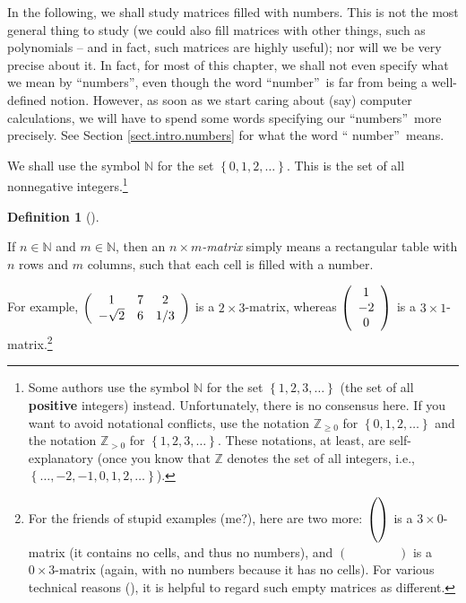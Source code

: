 \documentclass[numbers=enddot,12pt,final,onecolumn,notitlepage]{scrartcl}%
\theoremstyle{definition}
\newtheorem{defi}[theo]{Definition}
\newenvironment{definition}[1][]
{\begin{defi}[#1]\begin{leftbar}}
{\end{leftbar}\end{defi}}
\begin{document}
In the following, we shall study matrices filled with numbers. This is not the
most general thing to study (we could also fill matrices with other things,
such as polynomials -- and in fact, such matrices are highly useful); nor will
we be very precise about it. In fact, for most of this chapter, we shall not
even specify what we mean by \textquotedblleft numbers\textquotedblright, even
though the word \textquotedblleft number\textquotedblright\ is far from being
a well-defined notion. However, as soon as we start caring about (say)
computer calculations, we will have to spend some words specifying our
\textquotedblleft numbers\textquotedblright\ more precisely. See Section
\ref{sect.intro.numbers} for what the word \textquotedblleft
number\textquotedblright\ means.

We shall use the symbol $\mathbb{N}$ for the set $\left\{  0,1,2,\ldots
\right\}  $. This is the set of all nonnegative integers.\footnote{Some
authors use the symbol $\mathbb{N}$ for the set $\left\{  1,2,3,\ldots
\right\}  $ (the set of all \textbf{positive} integers) instead.
Unfortunately, there is no consensus here. If you want to avoid notational
conflicts, use the notation $\mathbb{Z}_{\geq0}$ for $\left\{  0,1,2,\ldots
\right\}  $ and the notation $\mathbb{Z}_{>0}$ for $\left\{  1,2,3,\ldots
\right\}  $. These notations, at least, are self-explanatory (once you know
that $\mathbb{Z}$ denotes the set of all integers, i.e., $\left\{
\ldots,-2,-1,0,1,2,\ldots\right\}  $).}

\begin{definition}
If $n\in\mathbb{N}$ and $m\in\mathbb{N}$, then an $n\times m$\textit{-matrix}
simply means a rectangular table with $n$ rows and $m$ columns, such that each
cell is filled with a number.
\end{definition}

For example, $\left(
\begin{array}
[c]{ccc}%
1 & 7 & 2\\
-\sqrt{2} & 6 & 1/3
\end{array}
\right)  $ is a $2\times3$-matrix, whereas $\left(
\begin{array}
[c]{c}%
1\\
-2\\
0
\end{array}
\right)  $ is a $3\times1$-matrix.\footnote{For the friends of stupid examples
(me?), here are two more: $\left(
\vphantom{\begin{array}{c} a \\ a \\ a \end{array}}\right)  $ is a $3\times
0$-matrix (it contains no cells, and thus no numbers), and $\left(
\phantom{\begin{array}{ccc} a & a & a \end{array}}\right)  $ is a $0\times
3$-matrix (again, with no numbers because it has no cells). For various
technical reasons (\cite{deBoor}), it is helpful to regard such empty matrices
as different.}
\end{document}
